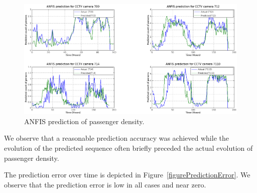 \begin{figure}
\hspace*{-0.6\columnwidth}%
\parbox{1.6\columnwidth}{
  \centering
  \includegraphics[width=1.6\columnwidth]{Figures/Figure_Prediction.png}
  \caption{ANFIS prediction of passenger density.}
  \label{FigurePrediction}
 }
\end{figure}

We observe that a reasonable prediction accuracy was achieved while the evolution of the predicted sequence often briefly preceded the actual evolution of passenger density.

The prediction error over time is depicted in Figure~\ref{figurePredictionError}.
We observe that the prediction error is low in all cases and near zero.





